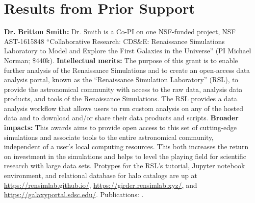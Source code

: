 \section{Results from Prior Support}

\noindent \textbf{Dr. Britton Smith:} Dr. Smith is a Co-PI on one
NSF-funded project, NSF AST-1615848 ``Collaborative Research: CDS\&E:
Renaissance Simulations Laboratory to Model and Explore the First
Galaxies in the Universe'' (PI Michael
Norman; \$440k).  \textbf{Intellectual merits:} The purpose of this
grant is to enable further analysis of the Renaissance
Simulations \citep{2015ApJ...807L..12O} and to create an open-access
data analysis portal, known as the ``Renaissance Simulation
Laboratory'' (RSL), to provide the astronomical community with access
to the raw data, analysis data products, and tools of the Renaissance
Simulations.  The RSL provides a data analysis workflow that allows users to
run custom analysis on any of the hosted data and to download and/or
share their data products and scripts.  \textbf{Broader impacts:}
This awards aims to provide open access to this set of cutting-edge
simulations and associate tools to the entire astronomical community,
independent of a user's local computing resources.  This both
increases the return on investment in the simulations and helps to
level the playing field for scientific research with large data sets.
Protypes for the RSL's tutorial, Jupyter notebook environment, and
relational database for halo catalogs are up
at \url{https://rensimlab.github.io/}, \url{https://girder.rensimlab.xyz/}, 
and \url{https://galaxyportal.sdsc.edu/}.
Publications: \citep{2016ApJ...832L...5X, 2016ApJ...833...84X,
Barrow17_FL2, 2017ApJ...845...47T, 2017ApJ...847...59H}.

